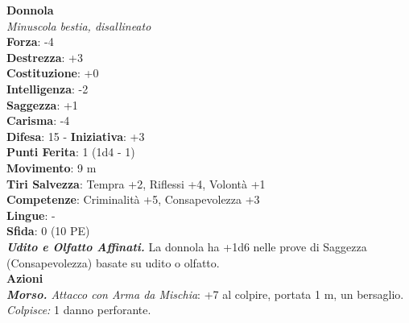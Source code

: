 \begin{multicols}{2}
\medskip\textbf{Donnola}\\
\emph{Minuscola bestia, disallineato}\\
\textbf{Forza}: -4\\
\textbf{Destrezza}: +3\\
\textbf{Costituzione}: +0\\
\textbf{Intelligenza}: -2\\
\textbf{Saggezza}: +1\\
\textbf{Carisma}: -4\\
\textbf{Difesa}: 15 - \textbf{Iniziativa}: +3\\
\textbf{Punti Ferita}: 1 (1d4 - 1)\\
\textbf{Movimento}: 9 m\\
\textbf{Tiri Salvezza}: Tempra +2, Riflessi +4, Volontà +1\\
\textbf{Competenze}: Criminalità +5, Consapevolezza +3\\
\textbf{Lingue}: -\\
\textbf{Sfida}: 0 (10 PE)\smallskip\\
\emph{\textbf{Udito e Olfatto Affinati.}} La donnola ha +1d6 nelle prove di Saggezza (Consapevolezza) basate su udito o olfatto.\\
\smallskip\textbf{Azioni}\\
\emph{\textbf{Morso.} Attacco con Arma da Mischia}: +7 al colpire, portata 1 m, un bersaglio.\\
\emph{Colpisce:} 1 danno perforante.\\



\end{multicols}

